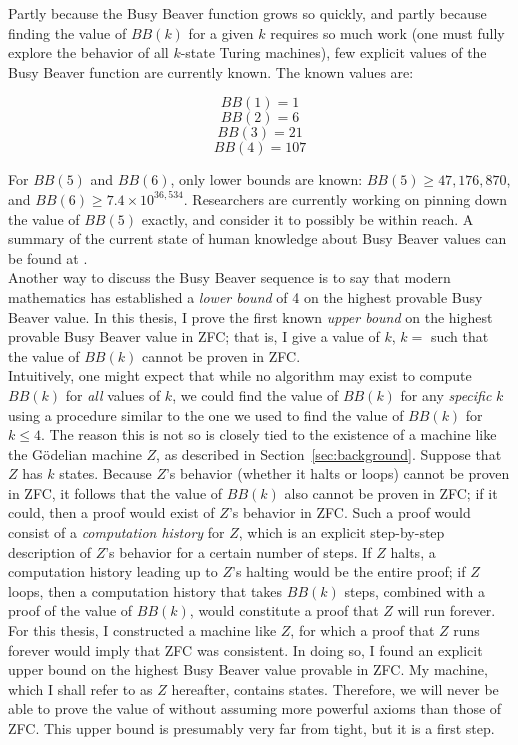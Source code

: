 Partly because the Busy Beaver function grows so quickly, and partly because finding the value of $BB(k)$ for a given $k$ requires so much work (one must fully explore the behavior of all $k$-state Turing machines), few explicit values of the Busy Beaver function are currently known. The known values are: 

$$BB(1) = 1$$
$$BB(2) = 6$$
$$BB(3) = 21$$
$$BB(4) = 107$$

For $BB(5)$ and $BB(6)$, only lower bounds are known: $BB(5) \ge 47,176,870$, and $BB(6) \ge 7.4 \times 10^{36,534}$. Researchers are currently working on pinning down the value of $BB(5)$ exactly, and consider it to possibly be within reach. A summary of the current state of human knowledge about Busy Beaver values can be found at \cite{bbvalues}.\\


Another way to discuss the Busy Beaver sequence is to say that modern mathematics has established a \emph{lower bound} of 4 on the highest provable Busy Beaver value. In this thesis, I prove the first known \emph{upper bound} on the highest provable Busy Beaver value in ZFC; that is, I give a value of $k$, $k=$ \bbstatenumcomma such that the value of $BB(k)$ cannot be proven in ZFC. \\

Intuitively, one might expect that while no algorithm may exist to compute $BB(k)$ for \emph{all} values of $k$, we could find the value of $BB(k)$ for any \emph{specific} $k$ using a procedure similar to the one we used to find the value of $BB(k)$ for $k \le 4$. The reason this is not so is closely tied to the existence of a machine like the G\"{o}delian machine $Z$, as described in Section~\ref{sec:background}. Suppose that $Z$ has $k$ states. Because $Z$'s behavior (whether it halts or loops) cannot be proven in ZFC, it follows that the value of $BB(k)$ also cannot be proven in ZFC; if it could, then a proof would exist of $Z$'s behavior in ZFC. Such a proof would consist of a \emph{computation history} for $Z$, which is an explicit step-by-step description of $Z$'s behavior for a certain number of steps. If $Z$ halts, a computation history leading up to $Z$'s halting would be the entire proof; if $Z$ loops, then a computation history that takes $BB(k)$ steps, combined with a proof of the value of $BB(k)$, would constitute a proof that $Z$ will run forever. \\

For this thesis, I constructed a machine like $Z$, for which a proof that $Z$ runs forever would imply that ZFC was consistent. In doing so, I found an explicit upper bound on the highest Busy Beaver value provable in ZFC. My machine, which I shall refer to as $Z$ hereafter, contains \statenum states. Therefore, we will never be able to prove the value of \bbstatenum without assuming more powerful axioms than those of ZFC. This upper bound is presumably very far from tight, but it is a first step.

